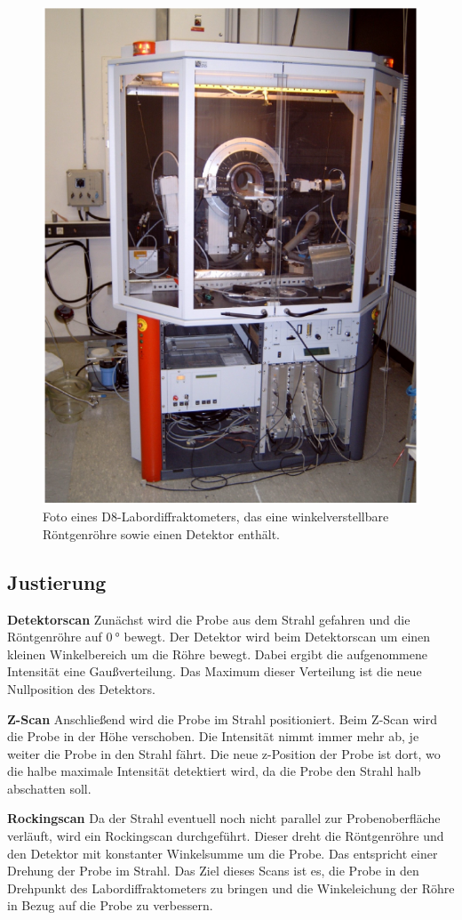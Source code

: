 \begin{figure}
    \centering
    \includegraphics[width=0.5\linewidth]{./figures/D8.png}
    \caption{Foto eines D8-Labordiffraktometers, das eine winkelverstellbare Röntgenröhre sowie einen Detektor enthält. \cite{V44old}}
    \label{fig:D8}
\end{figure}



\subsection{Justierung}
\textbf{Detektorscan}
\newline
Zunächst wird die Probe aus dem Strahl gefahren und die Röntgenröhre auf $\SI{0}{\degree}$ bewegt. Der Detektor wird beim Detektorscan um einen kleinen Winkelbereich um die Röhre bewegt. Dabei ergibt die aufgenommene Intensität eine Gaußverteilung. Das Maximum dieser Verteilung ist die neue Nullposition des Detektors.

\textbf{Z-Scan}
\newline
Anschließend wird die Probe im Strahl positioniert. Beim Z-Scan wird die Probe in der Höhe verschoben. Die Intensität nimmt immer mehr ab, je weiter die Probe in den Strahl fährt. Die neue z-Position der Probe ist dort, wo die halbe maximale Intensität detektiert wird, da die Probe den Strahl halb abschatten soll.

\textbf{Rockingscan}
\newline
Da der Strahl eventuell noch nicht parallel zur Probenoberfläche verläuft, wird ein Rockingscan durchgeführt. Dieser dreht die Röntgenröhre und den Detektor mit konstanter Winkelsumme um die Probe. Das entspricht einer Drehung der Probe im Strahl. Das Ziel dieses Scans ist es, die Probe in den Drehpunkt des Labordiffraktometers zu bringen und die Winkeleichung der Röhre in Bezug auf die Probe zu verbessern.

